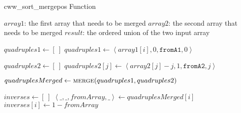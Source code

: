             \begin{frame}[containsverbatim]{\cwwSortMergePosfunctionframe}
                \begingroup
                    \makeatletter
                    \renewcommand{\alglinenumber}[1]{\tiny#1}
                    \makeatother
                    \begin{algorithm}[H]
                        \tiny
                        \caption{cww\_sort\_mergepos Function} \label{cww_sort_mergepos function}
                        \begin{multicols}{2}
                            \begin{algorithmic}[1]
                                \Require 
                                    \Statex $array1$: the first array that needs to be merged
                                    \Statex $array2$: the second array that needs to be merged
                                \Ensure
                                    \Statex $result$: the ordered union of the two input array
                                \Statex
                
                                    \State $quadruples1 \gets \left[\ \right]$
                                        \State $quadruples1 \gets \left<array1{\left[i\right]}, 0, \texttt{fromA1}, 0\right>$
                                    \EndFor
    
                                    \State $quadruples2 \gets \left[\ \right]$
                                        \State $quadruples2{\left[j\right]} \gets \left<array2{\left[j\right]} - j, 1, \texttt{fromA2}, j\right>$
                                    \EndFor
    
                                    \State $quadruplesMerged \gets \Call{merge}{quadruples1, quadruples2}$
    
                                    \State $inverses \gets \left[\ \right]$
                                        \State $\left<\_, \_, fromArray, \_\right> \gets quadruplesMerged{\left[i\right]}$
                                        \State $inverses{\left[i\right]} \gets 1 - fromArray$
                                    \EndFor
    

\end{algorithmic}
\end{multicols}
\end{algorithm}
\end{frame}
